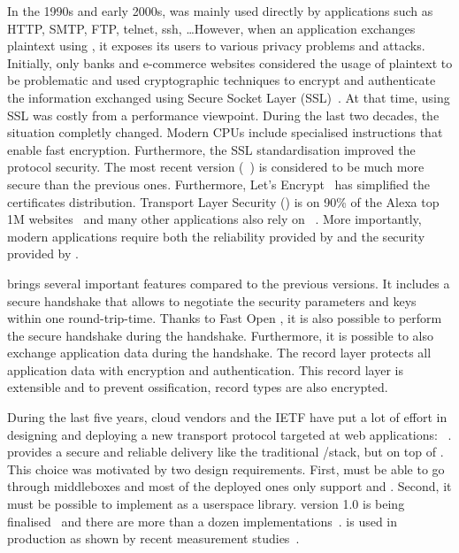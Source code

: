 In the 1990s and early 2000s, \tcp was mainly used directly by applications such
as HTTP, SMTP, FTP, telnet, ssh, \ldots However, when an application exchanges
plaintext using \tcp, it exposes its users to various privacy problems and
attacks. Initially, only banks and e-commerce websites considered the usage of
plaintext to be problematic and used cryptographic techniques to encrypt and
authenticate the information exchanged using Secure Socket Layer
(SSL)~\cite{draft-hickman-netscape-ssl}. At that time, using SSL was costly from
a performance viewpoint. During the last two decades, the situation completly
changed. Modern CPUs include specialised instructions that enable fast
encryption. Furthermore, the SSL standardisation improved the protocol security.
The most recent version (~\cite{rfc8446}) is considered to be much more
secure than the previous ones. Furthermore, Let's Encrypt~\cite{aas2019let} has
simplified the certificates distribution. Transport Layer Security (\tls) is on
90\% of the Alexa top 1M websites~\cite{holz2019era,holz2020tracking} and many
other applications also rely on \tls~\cite{anderson2019tls}. More importantly,
modern applications require both the reliability provided by \tcp and the
security provided by \tls.

 brings several important features compared to the previous versions. It
includes a secure handshake that allows to negotiate the security parameters and
keys within one round-trip-time. Thanks to \tcp Fast Open
\cite{radhakrishnan2011tcp}, it is also possible to perform the secure handshake
during the \tcp handshake. Furthermore, it is possible to also exchange
application data during the handshake. The  record layer protects all
application data with encryption and authentication. This record layer is
extensible and to prevent ossification, \tls record types are also encrypted.





During the last five years, cloud vendors and the IETF have put a lot of effort
in designing and deploying a new transport protocol targeted at web
applications: \quic~\cite{langley2017quic}. \quic provides a secure and
reliable delivery like the traditional \tls/\tcp stack, but on top of \udp. This
choice was motivated by two design requirements. First, \quic must be able to go
through middleboxes and most of the deployed ones only support \tcp and \udp.
Second, it must be possible to implement \quic as a userspace library. \quic
version 1.0 is being finalised~\cite{draft-ietf-quic-transport} and there are
more than a dozen implementations~\cite{quicimplem,marx2020same}. \quic is used
in production as shown by recent measurement studies~\cite{trevisan2020five}.

